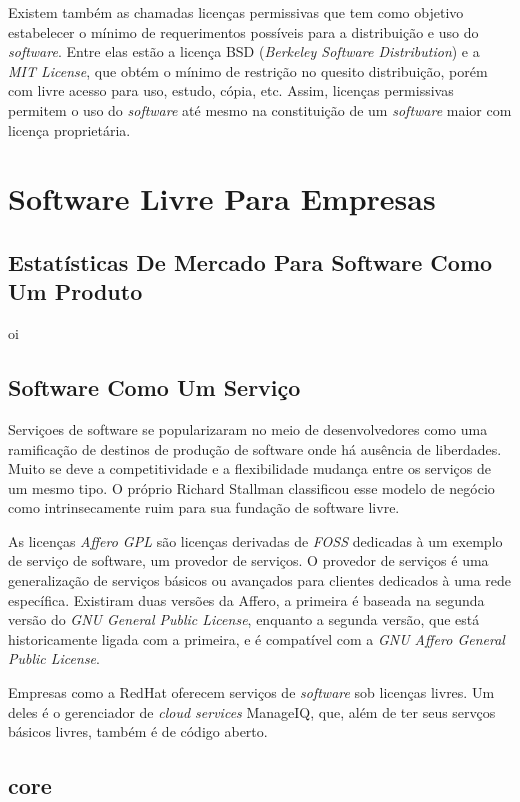 \documentclass{classe_cn}                 %
\begin{document}
Existem também as chamadas licenças permissivas que tem como objetivo estabelecer o mínimo de requerimentos possíveis para a distribuição e uso do \textit{software}. Entre elas estão a licença BSD (\textit{Berkeley Software Distribution}) e a \textit{MIT License}, que obtém o mínimo de restrição no quesito distribuição, porém com livre acesso para uso, estudo, cópia, etc. Assim, licenças permissivas permitem o uso do \textit{software} até mesmo na constituição de um \textit{software} maior com licença proprietária.

\section{Software Livre Para Empresas}


\subsection{Estatísticas De Mercado Para Software Como Um Produto}
oi


\subsection{Software Como Um Serviço}

Serviçoes de software se popularizaram no meio de desenvolvedores como uma ramificação de destinos de produção de software onde há ausência de liberdades. Muito se deve a competitividade e a flexibilidade mudança entre os serviços de um mesmo tipo. O próprio Richard Stallman classificou esse modelo de negócio como intrinsecamente ruim para sua fundação de software livre. 

As licenças \textit{Affero GPL} são licenças derivadas de \textit{FOSS} dedicadas à um exemplo de serviço de software, um provedor de serviços. O provedor de serviços é uma generalização de serviços básicos ou avançados para clientes dedicados à uma rede específica. Existiram duas versões da Affero, a primeira é baseada na segunda versão do \textit{GNU General Public License}, enquanto a segunda versão, que está historicamente ligada com a primeira, e é compatível com a \textit{GNU Affero General Public License}.

Empresas como a RedHat oferecem serviços de \textit{software} sob licenças livres. Um deles é o gerenciador de \textit{cloud services} ManageIQ, que, além de ter seus servços básicos livres, também é de código aberto.

\subsection{core}
\end{document}

